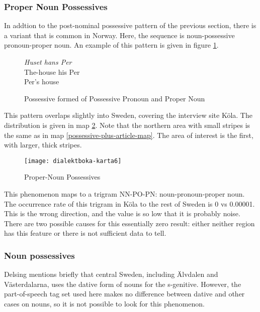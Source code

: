 

\subsubsection{Proper Noun Possessives}

In addtion to the post-nominal possessive pattern of the previous
section, there is a variant that is common in Norway. Here, the
sequence is noun-possessive pronoun-proper noun. An example
of this pattern is given in figure \ref{proper-noun-post-possessive}.

\begin{figure}
  {\it Huset hans Per} \\
  The-house his Per \\
  Per's house
  \caption{Possessive formed of Possessive Pronoun and Proper Noun}
  \label{proper-noun-post-possessive}
\end{figure}

This pattern overlaps slightly into Sweden, covering the interview
site K\"ola. The distribution is given in map
\ref{proper-noun-post-possessive-map}. Note that the northern area
with small stripes is the same as in map
\ref{possessive-plus-article-map}. The area of interest is the first,
with larger, thick stripes.

\begin{figure}
  \texttt{[image: dialektboka-karta6]}
  \caption{Proper-Noun Possessives}
  \label{proper-noun-post-possessive-map}
\end{figure}

This phenomenon maps to a trigram NN-PO-PN: noun-pronoun-proper
noun. The occurrence rate of this trigram in K\"ola to the rest of
Sweden is 0 vs 0.00001. This is the wrong direction, and the value is
so low that it is probably noise. There are two possible causes for
this essentially zero result: either neither region has this feature
or there is not sufficient data to tell.

\subsubsection{Noun possessives}

Delsing mentions briefly that central Sweden, including \"Alvdalen and
V\"asterdalarna, uses the dative form of nouns for the
s-genitive. However, the part-of-speech tag set used here makes no
difference between dative and other cases on nouns, so it is not
possible to look for this phenomenon.

